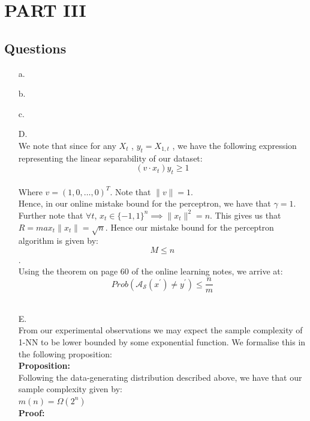 \documentclass[12pt]{article}
\begin{document}
\section{PART III}
\subsection{Questions}
\begin{itemize}
    \item[a.]
    \item[b.]
    \item[c.]
    \item[D.]\\
    We note that since for any $X_{t}$ , $y_{t} = X_{1,t}$ , we have the following
     expression representing the linear separability of our dataset:\\
    \[(v \cdot x_{t})y_{t} \ge 1\]\\
    Where $v = (1,0, \dots, 0)^{T}$. Note that $\|v\| =1$.\\
    Hence, in our online mistake bound for the perceptron, we have that $\gamma =1$.
    Further note that $\forall t$, $x_{t} \in \{-1,1\}^{n} \implies \|x_{t}\|^{2}
    = n$. This gives us that $R = max_{t} \|x_{t}\| = \sqrt{n}$.
    Hence our mistake bound for the perceptron algorithm is given by:\\
    
    \[M \le n \].\\

    Using the theorem on page 60 of the online learning notes, we arrive at:\\

    \[Prob(\mathcal{A_{S}}(x ^{\prime}) \ne y^{\prime} ) \le \frac{n}{m}\]\\

     \item[E.]\\
     From our experimental observations we may expect the sample complexity of 1-NN
     to be lower bounded by some exponential function. We formalise this in the
     following proposition:\\

    \textbf{Proposition:}\\

    Following the data-generating distribution described above, we have that our sample complexity given by:\\

    $m(n) = \Omega (2^{n})$ \\
    \textbf{Proof:}\\


\end{itemize}
\end{document}
